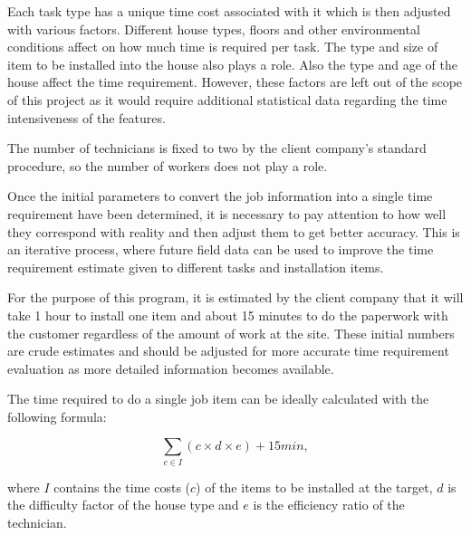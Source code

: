 Each task type has a unique time cost associated with it which is then adjusted with various factors. Different house types, floors and other environmental conditions affect on how much time is required per task. The type and size of item to be installed into the house also plays a role. Also the type and age of the house affect the time requirement. However, these factors are left out of the scope of this project as it would require additional statistical data regarding the time intensiveness of the features.  

The number of technicians is fixed to two by the client company's standard procedure, so the number of workers does not play a role.  

Once the initial parameters to convert the job information into a single time requirement have been determined, it is necessary to pay attention to how well they correspond with reality and then adjust them to get better accuracy. This is an iterative process, where future field data can be used to improve the time requirement estimate given to different tasks and installation items.

For the purpose of this program, it is estimated by the client company that it will take 1 hour to install one item and about 15 minutes to do the paperwork with the customer regardless of the amount of work at the site. These initial numbers are crude estimates and should be adjusted for more accurate time requirement evaluation as more detailed information becomes available.

The time required to do a single job item can be ideally calculated with the following formula: 


\begin{equation}
\label{eq:timecost}
\displaystyle \sum_{c \in I} (c\times d\times e) + 15 min,
\end{equation}

where $I$ contains the time costs ($c$) of the items to be installed at the target, $d$ is the difficulty factor of the house type and $e$ is the efficiency ratio of the technician.  














